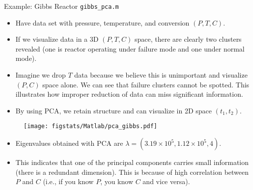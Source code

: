 \documentclass[handout,9pt]{beamer}
\begin{document}
%
\begin{frame}{Example: Gibbs Reactor \footnotesize{\texttt{gibbs\_pca.m}}}

\begin{itemize}
\setlength{\itemsep}{3pt}
\item Have data set with pressure, temperature, and conversion $(P,T,C)$.
\item If we visualize data in a 3D $(P,T,C)$ space, there are clearly two clusters revealed (one is reactor operating under failure mode and one under normal mode).
\item Imagine we drop $T$ data because we believe this is unimportant and visualize $(P,C)$ space alone. We can see that   failure clusters cannot be spotted. This illustrates how improper reduction of data can miss significant information. 
\item By using PCA, we retain structure and can visualize in 2D space $(t_1,t_2)$.
\end{itemize}

\begin{figure}[!htb]
    \centering
	\texttt{[image: figstats/Matlab/pca\_gibbs.pdf]}
\end{figure}

\begin{itemize}
\item Eigenvalues obtained with PCA are $\lambda=(3.19\times 10^5,1.12\times 10^5,4)$. 
\item This indicates that one of the principal components carries small information (there is a redundant dimension). This is because of high correlation between $P$ and $C$ (i.e., if you know $P$, you know $C$ and vice versa). 
\end{itemize}


\end{frame}
\end{document}
